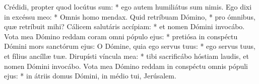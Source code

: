  Crédidi, propter quod locútus sum: * ego autem humiliátus sum nimis.
\versseparator
 Ego dixi in excéssu meo: * Omnis homo mendax.
\versseparator
 Quid retríbuam Dómino, * pro ómnibus, quæ retríbuit mihi?
\versseparator
 Cálicem salutáris accípiam: * et nomen Dómini invocábo.
\versseparator
 Vota mea Dómino reddam coram omni pópulo ejus: * pretiósa in conspéctu Dómini mors sanctórum ejus:
\versseparator
 O Dómine, quia ego servus tuus: * ego servus tuus, et fílius ancíllæ tuæ.
\versseparator
 Dirupísti víncula mea: * tibi sacrificábo hóstiam laudis, et nomen Dómini invocábo.
\versseparator
 Vota mea Dómino reddam in conspéctu omnis pópuli ejus: * in átriis domus Dómini, in médio tui, Jerúsalem.